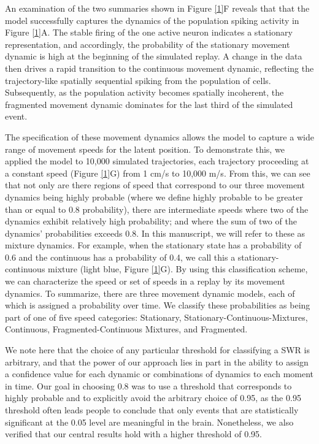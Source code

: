 \documentclass[times, twoside]{zHenriquesLab-StyleBioRxiv}
\begin{document}
An examination of the two summaries shown in Figure \ref{1}F reveals that that the model successfully captures the dynamics of the population spiking activity in Figure \ref{1}A. The stable firing of the one active neuron indicates a stationary representation, and accordingly, the probability of the stationary movement dynamic is high at the beginning of the simulated replay. A change in the data then drives a rapid transition to the continuous movement dynamic, reflecting the trajectory-like spatially sequential spiking from the population of cells. Subsequently, as the population activity becomes spatially incoherent, the fragmented movement dynamic dominates for the last third of the simulated event.

The specification of these movement dynamics allows the model to capture a wide range of movement speeds for the latent position. To demonstrate this, we applied the model to 10,000 simulated trajectories, each trajectory proceeding at a constant speed (Figure \ref{1}G) from 1 cm/s to 10,000 m/s. From this, we can see that not only are there regions of speed that correspond to our three movement dynamics being highly probable (where we define highly probable to be greater than or equal to 0.8 probability), there are intermediate speeds where two of the dynamics exhibit relatively high probability; and where the sum of two of the dynamics' probabilities exceeds 0.8. In this manuscript, we will refer to these as mixture dynamics. For example, when the stationary state has a probability of 0.6 and the continuous has a probability of 0.4, we call this a stationary-continuous mixture (light blue, Figure \ref{1}G). By using this classification scheme, we can characterize the speed or set of speeds in a replay by its movement dynamics. To summarize, there are three movement dynamic models, each of which is assigned a probability over time. We classify these probabilities as being part of one of five speed categories: Stationary, Stationary-Continuous-Mixtures, Continuous, Fragmented-Continuous Mixtures, and Fragmented.

We note here that the choice of any particular threshold for classifying a SWR is arbitrary, and that the power of our approach lies in part in the ability to assign a confidence value for each dynamic or combinations of dynamics to each moment in time. Our goal in choosing 0.8 was to use a threshold that corresponds to highly probable and to explicitly avoid the arbitrary choice of 0.95, as the 0.95 threshold often leads people to conclude that only events that are statistically significant at the 0.05 level are meaningful in the brain. Nonetheless, we also verified that our central results hold with a higher threshold of 0.95. 
\end{document}
